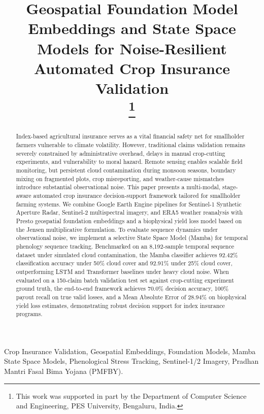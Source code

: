 \documentclass[conference]{IEEEtran}
\begin{document}
\title{Geospatial Foundation Model Embeddings and State Space Models for Noise-Resilient Automated Crop Insurance Validation\\
\thanks{This work was supported in part by the Department of Computer Science and Engineering, PES University, Bengaluru, India.}
}

\maketitle

\begin{abstract}
Index-based agricultural insurance serves as a vital financial safety net for smallholder farmers vulnerable to climate volatility. However, traditional claims validation remains severely constrained by administrative overhead, delays in manual crop-cutting experiments, and vulnerability to moral hazard. Remote sensing enables scalable field monitoring, but persistent cloud contamination during monsoon seasons, boundary mixing on fragmented plots, crop misreporting, and weather-cause mismatches introduce substantial observational noise. This paper presents a multi-modal, stage-aware automated crop insurance decision-support framework tailored for smallholder farming systems. We combine Google Earth Engine pipelines for Sentinel-1 Synthetic Aperture Radar, Sentinel-2 multispectral imagery, and ERA5 weather reanalysis with Presto geospatial foundation embeddings and a biophysical yield loss model based on the Jensen multiplicative formulation. To evaluate sequence dynamics under observational noise, we implement a selective State Space Model (Mamba) for temporal phenology sequence tracking. Benchmarked on an 8,192-sample temporal sequence dataset under simulated cloud contamination, the Mamba classifier achieves 92.42\% classification accuracy under 50\% cloud cover and 92.91\% under 25\% cloud cover, outperforming LSTM and Transformer baselines under heavy cloud noise. When evaluated on a 150-claim batch validation test set against crop-cutting experiment ground truth, the end-to-end framework achieves 70.0\% decision accuracy, 100\% payout recall on true valid losses, and a Mean Absolute Error of 28.94\% on biophysical yield loss estimates, demonstrating robust decision support for index insurance programs.
\end{abstract}

\begin{IEEEkeywords}
Crop Insurance Validation, Geospatial Embeddings, Foundation Models, Mamba State Space Models, Phenological Stress Tracking, Sentinel-1/2 Imagery, Pradhan Mantri Fasal Bima Yojana (PMFBY).
\end{IEEEkeywords}
\end{document}
